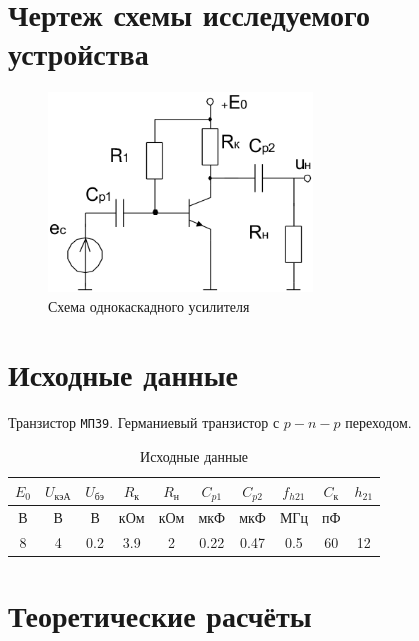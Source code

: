 \documentclass[a4paper,14pt]{extarticle}
\begin{document}
\section{Чертеж схемы исследуемого устройства}

\begin{figure}[H]
\begin{center}
	\includegraphics[width=7cm]{scheme}
	\caption{Схема однокаскадного усилителя}
\end{center}
\end{figure}

\section{Исходные данные}

Транзистор \verb+МП39+. Германиевый транзистор с $p-n-p$ переходом.

\begin{table}[H]
\begin{center}
	\caption{Исходные данные}
	\def\tabcolsep{10pt}
	\begin{tabular}{|c|c|c|c|c|c|c|c|c|c|}
		\hline
		$E_0$ &
		$U_\text{кэА}$ &
		$U_\text{бэ}$ &
		$R_\text{к}$ &
		$R_\text{н}$ &
		$C_{p1}$ &
		$C_{p2}$ &
		$f_{h21}$ &
		$C_\text{к}$ &
		$h_{21}$ \\
		\hline
		В &
		В &
		В &
		кОм &
		кОм &
		мкФ &
		мкФ &
		МГц &
		пФ &
		\\
		\hline
		8 &
		4 &
		0.2 &
		3.9 &
		2 &
		0.22 &
		0.47 &
		0.5 &
		60 &
		12 \\
	    \hline	
	\end{tabular}
	\label{tabular:1}
\end{center}
\end{table}

\newpage

\section{Теоретические расчёты}
\end{document}
